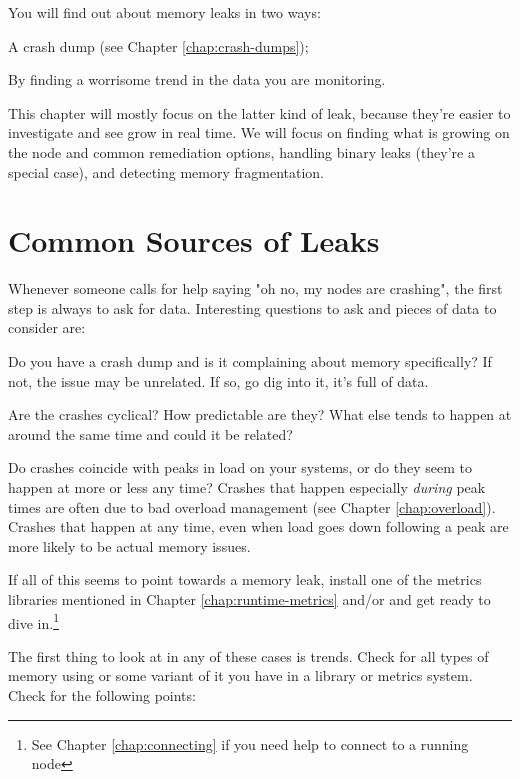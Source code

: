 \documentclass[11pt, oneside]{book}   	%
\begin{document}
You will find out about memory leaks in two ways:

\begin{enumerate*}
	\item A crash dump (see Chapter \ref{chap:crash-dumps});
	\item By finding a worrisome trend in the data you are monitoring. 
\end{enumerate*}

This chapter will mostly focus on the latter kind of leak, because they're easier to investigate and see grow in real time. We will focus on finding what is growing on the node and common remediation options, handling binary leaks (they're a special case), and detecting memory fragmentation. 
\section{Common Sources of Leaks}

Whenever someone calls for help saying "oh no, my nodes are crashing", the first step is always to ask for data. Interesting questions to ask and pieces of data to consider are:

\begin{itemize*}
	\item Do you have a crash dump and is it complaining about memory specifically? If not, the issue may be unrelated. If so, go dig into it, it's full of data.
	\item Are the crashes cyclical? How predictable are they? What else tends to happen at around the same time and could it be related?
	\item Do crashes coincide with peaks in load on your systems, or do they seem to happen at more or less any time? Crashes that happen especially \emph{during} peak times are often due to bad overload management (see Chapter \ref{chap:overload}). Crashes that happen at any time, even when load goes down following a peak are more likely to be actual memory issues.
\end{itemize*}

If all of this seems to point towards a memory leak, install one of the metrics libraries mentioned in Chapter \ref{chap:runtime-metrics} and/or  and get ready to dive in.\footnote{See Chapter \ref{chap:connecting} if you need help to connect to a running node}

The first thing to look at in any of these cases is trends. Check for all types of memory using  or some variant of it you have in a library or metrics system. Check for the following points:
\end{document}
